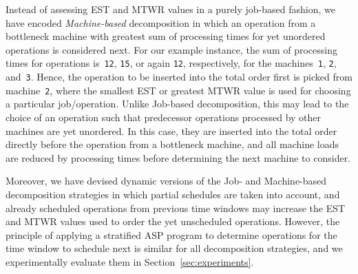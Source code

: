 \documentclass{tlp} %
\begin{document}
Instead of assessing EST and MTWR values in a purely job-based fashion,
we have encoded \emph{Machine-based} decomposition in which an operation
from a bottleneck machine with greatest sum of processing times for yet
unordered operations is considered next.
For our example instance, the sum of processing times for operations 
is~\lstinline{12}, \lstinline{15}, or again \lstinline{12}, respectively,
for the machines~\lstinline{1}, \lstinline{2}, and~\lstinline{3}.
Hence, the operation to be inserted into the total order first is picked from
machine~\lstinline{2}, where the smallest EST or greatest MTWR value is
used for choosing a particular job/operation.
Unlike Job-based decomposition, this may lead to the choice of an operation
such that predecessor operations processed by other machines are yet unordered.
In this case, they are inserted into the total order directly before the
operation from a bottleneck machine,
and all machine loads are reduced by processing times
before determining the next machine to consider.

Moreover, we have devised dynamic versions of the Job- and Machine-based 
decomposition strategies in which partial schedules are taken into account,
and already scheduled operations from previous time windows may increase the
EST and MTWR values used to order the yet unscheduled operations.
However, the principle of applying a stratified ASP program to determine
operations for the time window to schedule next is similar for all decomposition
strategies, and we experimentally evaluate them in Section~\ref{sec:experiments}.


\end{document}

